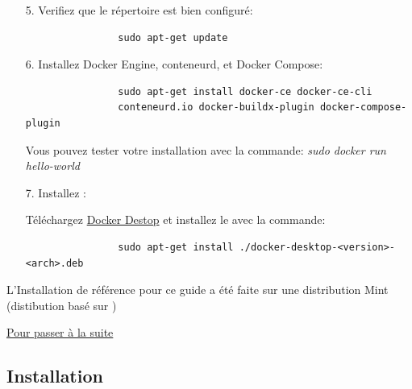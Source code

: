 \begin{itemize}
        \item[5.] Verifiez que le répertoire est bien configuré:

            \begin{lstlisting}
                sudo apt-get update
            \end{lstlisting}    

        \item[6.] Installez Docker Engine, conteneurd, et Docker Compose:

            \begin{lstlisting}
                sudo apt-get install docker-ce docker-ce-cli 
                conteneurd.io docker-buildx-plugin docker-compose-plugin
            \end{lstlisting}
            \begin{footnotesize}
                Vous pouvez tester votre installation avec la commande: \textit{sudo docker run hello-world}
            \end{footnotesize}

            \bigskip
        \item[7.] Installez \dockerdesktop{}:

        
            \begin{footnotesize}
                Téléchargez \href{https://desktop.docker.com/linux/main/amd64/docker-desktop-4.17.0-amd64.deb?utm_source=docker&utm_medium=webreferral&utm_campaign=docs-driven-download-linux-amd64}{Docker Destop} et installez le avec la commande:
            \end{footnotesize}

            \begin{lstlisting}
                sudo apt-get install ./docker-desktop-<version>-<arch>.deb
            \end{lstlisting}

    \end{itemize}

    \bigskip

    \begin{footnotesize}
        L'Installation de référence pour ce guide a été faite sur une distribution \linux{} Mint (distibution basé sur \ubuntu{})\\
    \end{footnotesize}

    \hyperref[sec:suite_installation]{Pour passer à la suite}

\newpage

\subsection[Installation Windows]{Installation \windows{}\label{sec:installation_windows}}

